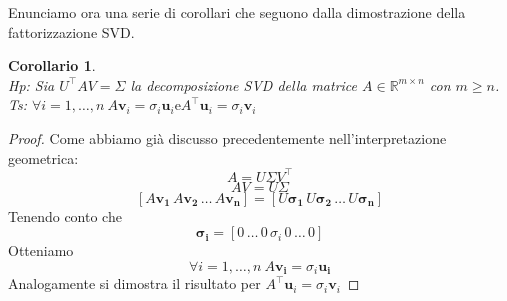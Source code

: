 \documentclass[11pt]{article}
\newtheorem{corollary}{Corollario}
\newcommand{\R}{\mathbb{R}} %
\begin{document}
\noindent
Enunciamo ora una serie di corollari che seguono dalla dimostrazione della fattorizzazione SVD.
\begin{corollary}\label{cor 3}
\textbf{}\\
\textit{Hp:} Sia $U^\top      AV=\Sigma$ la decomposizione SVD della matrice $A\in \R^{m \times n}$ con $m \geq n$. \\
\textit{Ts:} $\forall i=1, \dots ,n \ A \mathbf{v}_i= \sigma_i \mathbf{u}_i \text{e} A^\top       \mathbf{u}_i = \sigma_i \mathbf{v}_i$  
\end{corollary}
\begin{proof}
Come abbiamo già discusso precedentemente nell'interpretazione geometrica:
\[
A = U\Sigma V^\top       
\]
\[
AV = U\Sigma
\]
\[ 
[A\mathbf{v_1} \, A\mathbf{v_2} \, \dots \, A\mathbf{v_n}] = [U\mathbf{\sigma_1} \, U\mathbf{\sigma_2} \, \dots \, U\mathbf{\sigma_n}]
\]
Tenendo conto che 
\[
\mathbf{\sigma_i}=[0 \, \dots \, 0 \, \sigma_i \, 0 \, \dots \, 0]
\]
Otteniamo
$$\forall i=1,\dots,n\ A\mathbf{v_i}=\sigma_i\mathbf{u_i}
$$
Analogamente si dimostra il risultato per $A^\top       \mathbf{u}_i = \sigma_i \mathbf{v}_i$
\end{proof}
\end{document}
